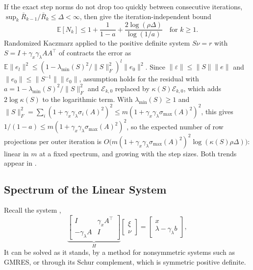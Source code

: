 \documentclass[11pt]{article}
\begin{document}
\begin{remark}\label{rem:per-iteration}
    If the exact step norms do not drop too quickly between consecutive iterations, $\sup_k \bar R_{k-1}/\bar R_{k} \leq \Delta < \infty$, then  give the iteration-independent bound
    \begin{equation*}
        \mathbb{E}[N_k] \leq 1 + \frac{1}{1-a} + \frac{2\log(\rho\Delta)}{\log(1/a)} \quad\text{for } k \geq 1.
    \end{equation*}
    Randomized Kaczmarz \citep{strohmer2007randomizedkaczmarzalgorithmexponential} applied to the positive definite system $S\nu = r$ with $S = I + \gamma_x\gamma_\lambda AA^\top$ of  contracts the error as $\mathbb{E}\|e_l\|^2 \leq (1 - \lambda_{\min}(S)^2/\|S\|_F^2)^l\|e_0\|^2$.
    Since $\|\varepsilon\| \leq \|S\|\|e\|$ and $\|e_0\| \leq \|S^{-1}\|\|\varepsilon_0\|$, assumption  holds for the residual with $a = 1 - \lambda_{\min}(S)^2/\|S\|_F^2$ and $\mathcal{E}_{k,0}$ replaced by $\kappa(S)\mathcal{E}_{k,0}$, which adds $2\log\kappa(S)$ to the logarithmic term.
    With $\lambda_{\min}(S) \geq 1$ and $\|S\|_F^2 = \sum_{i}(1 + \gamma_x\gamma_\lambda\sigma_i(A)^2)^2 \leq m(1 + \gamma_x\gamma_\lambda\sigma_{\max}(A)^2)^2$, this gives $1/(1-a) \leq m(1 + \gamma_x\gamma_\lambda\sigma_{\max}(A)^2)^2$, so the expected number of row projections per outer iteration is $O\big(m(1 + \gamma_x\gamma_\lambda\sigma_{\max}(A)^2)^2\log(\kappa(S)\rho\Delta)\big)$: linear in $m$ at a fixed spectrum, and growing with the step sizes.
    Both trends appear in .
\end{remark}

\subsection{Spectrum of the Linear System}\label{sec:linear-system-analysis}
Recall the system ,
\begin{equation*}
    \underbrace{\begin{bmatrix} I & \gamma_x A^\top \\ -\gamma_\lambda A & I \end{bmatrix}}_H\begin{bmatrix} \xi \\ \nu \end{bmatrix} = \begin{bmatrix} x \\ \lambda - \gamma_\lambda b \end{bmatrix},
\end{equation*}
It can be solved as it stands, by a method for nonsymmetric systems such as GMRES, or through its Schur complement, which is symmetric positive definite.
\end{document}
